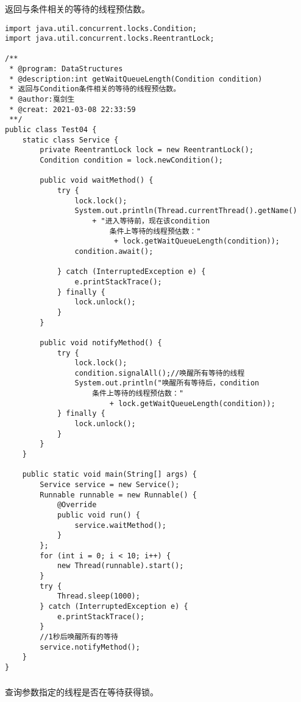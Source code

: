 \documentclass[a4paper]{report}
\begin{document}
\subsubsection{}
返回与条件相关的等待的线程预估数。

\begin{Verbatim}[frame=single,numbersep=5pt,xleftmargin=1.5em,xrightmargin=1.5em]
import java.util.concurrent.locks.Condition;
import java.util.concurrent.locks.ReentrantLock;

/**
 * @program: DataStructures
 * @description:int getWaitQueueLength(Condition condition)
 * 返回与Condition条件相关的等待的线程预估数。
 * @author:戛剑生
 * @creat: 2021-03-08 22:33:59
 **/
public class Test04 {
    static class Service {
        private ReentrantLock lock = new ReentrantLock();
        Condition condition = lock.newCondition();

        public void waitMethod() {
            try {
                lock.lock();
                System.out.println(Thread.currentThread().getName()
                    + "进入等待前，现在该condition
                        条件上等待的线程预估数："
                         + lock.getWaitQueueLength(condition));
                condition.await();

            } catch (InterruptedException e) {
                e.printStackTrace();
            } finally {
                lock.unlock();
            }
        }

        public void notifyMethod() {
            try {
                lock.lock();
                condition.signalAll();//唤醒所有等待的线程
                System.out.println("唤醒所有等待后，condition
                    条件上等待的线程预估数："
                        + lock.getWaitQueueLength(condition));
            } finally {
                lock.unlock();
            }
        }
    }

    public static void main(String[] args) {
        Service service = new Service();
        Runnable runnable = new Runnable() {
            @Override
            public void run() {
                service.waitMethod();
            }
        };
        for (int i = 0; i < 10; i++) {
            new Thread(runnable).start();
        }
        try {
            Thread.sleep(1000);
        } catch (InterruptedException e) {
            e.printStackTrace();
        }
        //1秒后唤醒所有的等待
        service.notifyMethod();
    }
}\end{Verbatim}
\subsubsection{}
查询参数指定的线程是否在等待获得锁。
\end{document}
